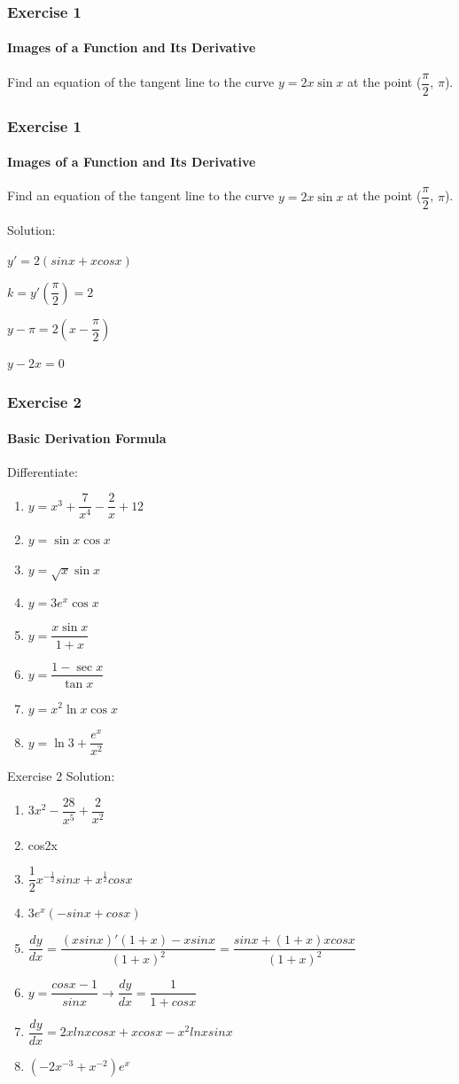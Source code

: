 \begin{frame}
    \frametitle{Exercise 1}
    \framesubtitle{Images of a Function and Its Derivative}
    Find an equation of the tangent line to the curve $y = 2x\sin{x}$ at the point ($\dfrac{\pi}{2}$, $\pi$).
\end{frame}



\begin{frame}
    \frametitle{Exercise 1}
    \framesubtitle{Images of a Function and Its Derivative}
    Find an equation of the tangent line to the curve $y = 2x\sin{x}$ at the point ($\dfrac{\pi}{2}$, $\pi$).

    Solution:

    $y' = 2(sinx + xcosx)$

    $k = y'(\dfrac{\pi}{2}) = 2$

    $y - \pi = 2(x - \dfrac{\pi}{2})$

    $ y - 2x = 0$
\end{frame}




\begin{frame}
    \frametitle{Exercise 2}
    \framesubtitle{Basic Derivation Formula}
    Differentiate:
    \begin{enumerate}
        \item $y = x^{3} + \dfrac{7}{x^{4}} - \dfrac{2}{x} + 12$
        \item $y = \sin{x}\cos{x}$
        \item $y = \sqrt{x}\sin{x}$
        \item $y = 3e^{x}\cos{x}$
        \item $y = \dfrac{x\sin{x}}{1 + x}$
        \item $y = \dfrac{1 - \sec{x}}{\tan{x}}$
        \item $y = x^{2}\ln{x}\cos{x}$
        \item $y = \ln{3} + \dfrac{e^{x}}{x^{2}}$
    \end{enumerate}
\end{frame}



\begin{frame}{Exercise 2}
    Solution:

    \begin{enumerate}
        \item $3x^2 - \dfrac{28}{x^5} + \dfrac{2}{x^2}$
        \item cos2x
        \item $\dfrac{1}{2}x^{-\frac{1}{2}}sinx + x^{\frac{1}{2}}cosx$
        \item $3e^x(-sinx + cosx)$
        \item $\dfrac{dy}{dx} = \dfrac{(xsinx)'(1+x)-xsinx}{(1+x)^2} = \dfrac{sinx + (1+x)xcosx}{(1+x)^2}$
        \item $y = \dfrac{cosx-1}{sinx}  \rightarrow \dfrac{dy}{dx} = \dfrac{1}{1+cosx}$
        \item $\dfrac{dy}{dx} = 2xlnxcosx + xcosx - x^2lnxsinx$
        \item $(-2x^{-3} + x^{-2})e^x$
    \end{enumerate}

\end{frame}

